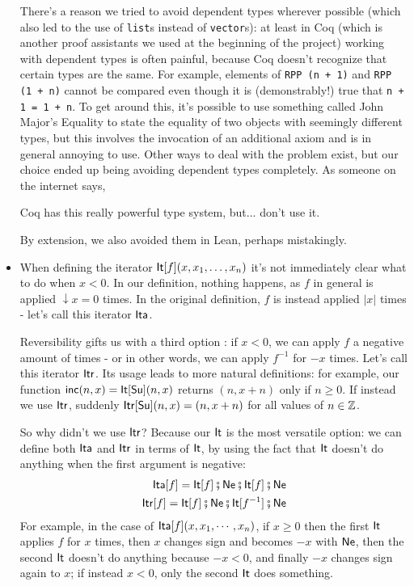 \documentclass[runningheads]{llncs}
\begin{document}
\begin{itemize}
    There's a reason we tried to avoid dependent types wherever possible
    (which also led to the use of \lstinline{list}s instead of \lstinline{vector}s):
    at least in Coq (which is another proof assistants we used at the beginning of the project)
    working with dependent types is often painful, because Coq doesn't recognize that certain types are the same.
    For example, elements of \lstinline{RPP (n + 1)} and \lstinline{RPP (1 + n)} cannot be compared even though it is (demonstrably!) true that
    \lstinline{n + 1 = 1 + n}. To get around this, it's possible to use something called John Major's Equality \cite{cpdtbook}
    to state the equality of two objects with seemingly different types,
    but this involves the invocation of an additional axiom and is in general annoying to use.
    Other ways to deal with the problem exist,
    but our choice ended up being avoiding dependent types completely.
    As someone on the internet says,
    \begin{displayquote}
        Coq has this really powerful type system, but... don't use it. \cite{dougdad}
    \end{displayquote}
    By extension, we also avoided them in Lean, perhaps mistakingly.
    \item When defining the iterator $\mathsf{It}[f] (x, x_1, \dots, x_n)$ it's not immediately clear what to do when $x < 0$.
    In our definition, nothing happens, as $f$ in general is applied $\downarrow x = 0$ times.
    In the original definition, $f$ is instead applied $| x |$ times - let's call this iterator $\mathsf{Ita}$.

    Reversibility gifts us with a third option \cite{matos03tcs}: if $x < 0$,
    we can apply $f$ a negative amount of times - or in other words, we can apply $f^{-1}$ for $- x$ times.
    Let's call this iterator $\mathsf{Itr}$.
    Its usage leads to more natural definitions:
    for example, our function $\mathsf{inc} (n, x) = \mathsf{It}[\mathsf{Su}] (n, x)$ returns $(n, x+n)$ only if $n \ge 0$.
    If instead we use $\mathsf{Itr}$, suddenly $\mathsf{Itr}[\mathsf{Su}] (n, x) = (n, x + n)$ for all values of $n \in \mathbb{Z}$.

    So why didn't we use $\mathsf{Itr}$?
    Because our $\mathsf{It}$ is the most versatile option:
    we can define both $\mathsf{Ita}$ and $\mathsf{Itr}$ in terms of $\mathsf{It}$,
    by using the fact that $\mathsf{It}$ doesn't do anything when the first argument is negative:
    \begin{align*}
        \mathsf{Ita}[f] = \mathsf{It}[f] \fatsemi \mathsf{Ne} \fatsemi \mathsf{It}[f] \fatsemi \mathsf{Ne} \\
        \mathsf{Itr}[f] = \mathsf{It}[f] \fatsemi \mathsf{Ne} \fatsemi \mathsf{It}[f^{-1}] \fatsemi \mathsf{Ne}
    \end{align*}
    For example, in the case of $\mathsf{Ita}[f](x,x_1,\cdots,x_n)$, if $x \ge 0$ then the first $\mathsf{It}$ applies $f$ for $x$ times,
    then $x$ changes sign and becomes $-x$ with $\mathsf{Ne}$, then the second $\mathsf{It}$ doesn't do anything because $- x < 0$,
    and finally $-x$ changes sign again to $x$; if instead $x < 0$, only the second $\mathsf{It}$ does something.


\end{itemize}
\end{document}
